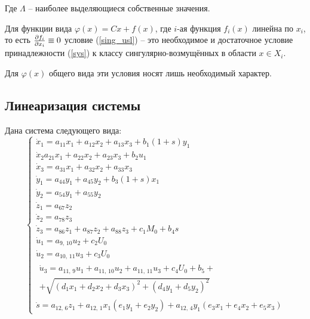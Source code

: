 	Где $\Lambda$ -- наиболее выделяющиеся собственные значения.
	
	Для функции вида $\varphi(x) = Cx + f(x)$, где $i$-ая функция $f_i (x)$ линейна по $x_i$, то есть $\pdv{f_i}{x_i} \equiv 0$ условие (\ref{sing_usl}) -- это необходимое и достаточное условие принадлежности (\ref{sys}) к классу сингулярно-возмущённых в области $x\in X_i$.
	
	Для $\varphi(x)$ общего вида эти условия носят лишь необходимый характер.
	
	\subsection{Линеаризация системы}
	
	Дана система следующего вида:
	\begin{equation}
		\begin{cases}
			\dot{x}_1 = a_{11} x_1 + a_{12} x_2 + a_{13} x_3 + b_1 (1+s) y_1 \\
			\dot{x}_2 a_{21} x_1 + a_{22} x_2 + a_{23} x_3 + b_2 u_1 \\ 
			\dot{x}_3 = a_{31} x_1 + a_{32} x_2 + a_{33} x_3 \\
			\dot{y}_1 = a_{44} y_1 + a_{45} y_2 + b_3 (1+s) x_1 \\
			\dot{y}_2 = a_{54} y_1 + a_{55} y_2 \\
			\dot{z}_1 = a_{67} z_2 \\
			\dot{z}_2 = a_{78} z_3 \\
			\dot{z}_3 = a_{86} z_1 + a_{87} z_2 + a_{88} z_3 + c_1 M_0 + b_4 s \\
			\dot{u}_1 = a_{9,\,10} u_2 + c_2 U_0 \\
			\dot{u}_2 = a_{10,\,11} u_3 + c_3 U_0 \\
			\begin{multlined}
				\dot{u}_3 = a_{11,\,9} u_1 + a_{11,\,10} u_2 + a_{11,\,11} u_3 + c_4 U_0 + b_5 + \\[-3ex] + \sqrt{ (d_1 x_1 + d_2 x_2 + d_3 x_3)^2 + (d_4 y_1 + d_5 y_2)^2 }	
			\end{multlined}
			 \\
			\dot{s} = a_{12,\,6} z_1 + a_{12,\,1} x_1(e_1 y_1 + e_2 y_2) + a_{12,\,4} y_1 (e_3 x_1 + e_4 x_2 + e_5 x_3)
		\end{cases}
		\label{sys_eq}
	\end{equation}
	
